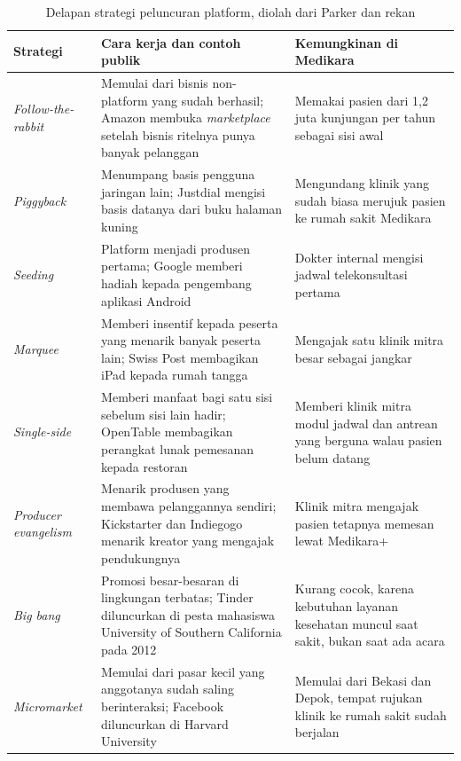 \begin{table}[!htb]
  \centering
  \caption{Delapan strategi peluncuran platform, diolah dari Parker dan rekan
           \cite{parker2016platform, c02-choudary2016launch}}
  \label{tab:ch02-strategi-peluncuran}
  \small
  \begin{tabularx}{\textwidth}{lXX}
    \hline
    \textbf{Strategi} & \textbf{Cara kerja dan contoh publik} & \textbf{Kemungkinan di Medikara} \\
    \hline
    \textit{Follow-the-rabbit} & Memulai dari bisnis non-platform yang sudah berhasil; Amazon membuka \textit{marketplace} setelah bisnis ritelnya punya banyak pelanggan & Memakai pasien dari 1,2 juta kunjungan per tahun sebagai sisi awal \\
    \hline
    \textit{Piggyback} & Menumpang basis pengguna jaringan lain; Justdial mengisi basis datanya dari buku halaman kuning & Mengundang klinik yang sudah biasa merujuk pasien ke rumah sakit Medikara \\
    \hline
    \textit{Seeding} & Platform menjadi produsen pertama; Google memberi hadiah kepada pengembang aplikasi Android & Dokter internal mengisi jadwal telekonsultasi pertama \\
    \hline
    \textit{Marquee} & Memberi insentif kepada peserta yang menarik banyak peserta lain; Swiss Post membagikan iPad kepada rumah tangga & Mengajak satu klinik mitra besar sebagai jangkar \\
    \hline
    \textit{Single-side} & Memberi manfaat bagi satu sisi sebelum sisi lain hadir; OpenTable membagikan perangkat lunak pemesanan kepada restoran & Memberi klinik mitra modul jadwal dan antrean yang berguna walau pasien belum datang \\
    \hline
    \textit{Producer evangelism} & Menarik produsen yang membawa pelanggannya sendiri; Kickstarter dan Indiegogo menarik kreator yang mengajak pendukungnya & Klinik mitra mengajak pasien tetapnya memesan lewat Medikara+ \\
    \hline
    \textit{Big bang} & Promosi besar-besaran di lingkungan terbatas; Tinder diluncurkan di pesta mahasiswa University of Southern California pada 2012 & Kurang cocok, karena kebutuhan layanan kesehatan muncul saat sakit, bukan saat ada acara \\
    \hline
    \textit{Micromarket} & Memulai dari pasar kecil yang anggotanya sudah saling berinteraksi; Facebook diluncurkan di Harvard University & Memulai dari Bekasi dan Depok, tempat rujukan klinik ke rumah sakit sudah berjalan \\
    \hline
  \end{tabularx}
\end{table}

